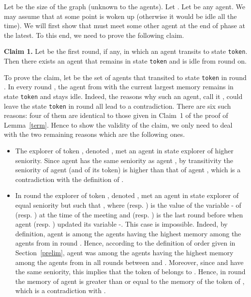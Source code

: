 \documentclass[11pt]{article}
\newcommand{\qed}{\hfill  \bigbreak}
\newenvironment{proof}{\noindent {\bf Proof.}}{\qed}
\begin{document}
\begin{proof}
Let  be the size of the graph (unknown to the agents). Let {}. Let  be any agent. 
We may assume that at some point  is woken up (otherwise it would be idle all the time).
{We will first show that  must meet some other agent at the end of phase  at the latest. To this end, we need to prove the following claim.}

\noindent
{{\bf Claim 1.} Let  be the first round, if any, in which an agent transits to state {\tt token}. Then there exists an agent  that remains in state {\tt token} and is idle from round  on. }

{To prove the claim, let  be the set of agents that transited to state {\tt token} in round . In every round , the agent from  with the current largest memory remains in state {\tt token} and stays idle. Indeed, the reasons why such an agent, call it , could leave the state {\tt token} in round  all lead to a contradiction. There are six such reasons: four of them are identical to those given in Claim~1 of the proof of Lemma~\ref{term}. Hence to show the validity of the claim, we only need to deal with the two remaining reasons which are the following ones.}
\begin{itemize}

\item{ The explorer of token , denoted , met an agent  in state explorer of higher seniority. Since agent  has the same seniority as agent , by transitivity the seniority of agent  (and of its token) is higher than that of agent , which is a contradiction with the definition of .}

\item{ In round  the explorer of token , denoted , met an agent  in state explorer of equal seniority but such that , where  (resp. ) is the value of the variable - of  (resp. ) at the time of the meeting and  (resp. ) is the last round before  when agent  (resp. ) updated its variable -. This case is impossible. Indeed, by definition, agent  is among the agents having the highest memory among the agents from  in round . Hence, according to the definition of order  given in Section~\ref{prelim}, agent  was among the agents having the highest memory among the agents from  in all rounds between  and . Moreover, since  and  have the same seniority, this implies that the token of  belongs to . Hence, in round  the memory of agent  is greater than or equal to the memory of the token of , which is a contradiction with .}

\end{itemize}


\end{proof}
\end{document}
